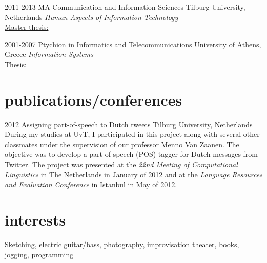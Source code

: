 \documentclass[]{friggeri-cv} %
\begin{document}
\begin{entrylist}


\entry
{2011-2013}
{MA Communication and Information Sciences}
{Tilburg University, Netherlands}
{\emph{Human Aspects of Information Technology} \\ 
\underline{Master thesis:}
}


\entry
{2001-2007}
{Ptychion in Informatics and Telecommunications}
{University of Athens, Greece}
{\emph{Information Systems} \\
\underline{Thesis:}
}


\end{entrylist}




\section{publications/conferences}

\begin{entrylist}


\entry
{2012}
{\href{http://ilk.uvt.nl/menno/files/docs/p_lrec_nlp4ugc12.pdf}{Assigning part-of-speech to Dutch tweets}}
{Tilburg University, Netherlands}
{During my studies at UvT, I participated in this project along with several other classmates under the supervision of our professor Menno Van Zaanen. The objective was to develop a part-of-speech (POS) tagger for Dutch messages from Twitter. The project was presented at the \emph{22nd Meeting of Computational Linguistics} in The Netherlands in January of 2012 and at the \emph{Language Resources and Evaluation Conference} in Istanbul in May of 2012.
}

\end{entrylist}


\section{interests}

Sketching, electric guitar/bass, photography, improvisation theater, books, jogging, programming

\end{document}

